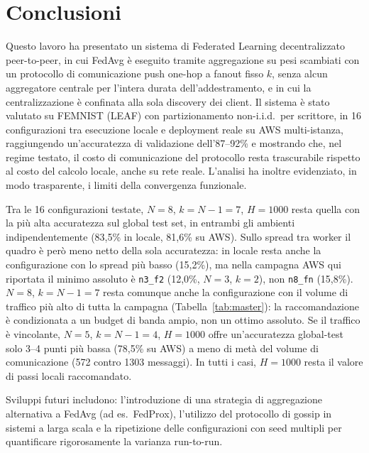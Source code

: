 \section{Conclusioni}
\label{sec:conclusions}

Questo lavoro ha presentato un sistema di Federated Learning decentralizzato
peer-to-peer, in cui FedAvg è eseguito tramite aggregazione su pesi
scambiati con un protocollo di comunicazione push one-hop a fanout fisso $k$,
senza alcun aggregatore centrale per l'intera durata dell'addestramento, e in
cui la centralizzazione è confinata alla sola discovery dei client. Il sistema è stato valutato su
FEMNIST (LEAF) con partizionamento non-i.i.d.\ per scrittore, in 16
configurazioni tra esecuzione locale e deployment reale su AWS multi-istanza,
raggiungendo un'accuratezza di validazione dell'87--92\% e mostrando che, nel
regime testato, il costo di comunicazione del protocollo resta trascurabile
rispetto al costo del calcolo locale, anche su rete reale. L'analisi ha inoltre evidenziato, in
modo trasparente, i limiti della convergenza funzionale.

Tra le 16 configurazioni testate, $N=8$, $k=N{-}1=7$, $H=1000$ resta quella
con la più alta accuratezza sul global test set, in entrambi gli ambienti
indipendentemente (83,5\% in locale, 81,6\% su AWS). Sullo spread tra worker
il quadro è però meno netto della sola accuratezza: in locale resta anche la
configurazione con lo spread più basso (15,2\%), ma nella campagna AWS qui
riportata il minimo assoluto è \texttt{n3\_f2} (12,0\%, $N=3$, $k=2$),
non \texttt{n8\_fn} (15,8\%). $N=8$, $k=N{-}1=7$ resta comunque anche la configurazione con il
volume di traffico più alto di tutta la campagna (Tabella~\ref{tab:master}):
la raccomandazione è condizionata a un budget di banda ampio, non un ottimo
assoluto. Se il traffico è vincolante, $N=5$, $k=N{-}1=4$, $H=1000$ offre
un'accuratezza global-test solo 3--4 punti più bassa (78,5\% su AWS) a meno di
metà del volume di comunicazione (572 contro 1303 messaggi). In tutti i casi,
$H=1000$ resta il valore di passi locali raccomandato.

Sviluppi futuri includono: l'introduzione di una strategia di
aggregazione alternativa a FedAvg (ad es.\ FedProx), l'utilizzo del protocollo di gossip in sistemi a larga
scala e la ripetizione delle
configurazioni con seed multipli per quantificare rigorosamente la varianza
run-to-run.

